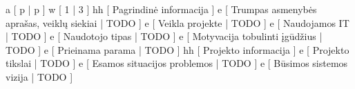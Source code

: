 \xtable
{
  a [ p | p ]
  w [ 1 | 3 ]
  hh [ Pagrindinė informacija ]
  e [ Trumpas asmenybės aprašas, veiklų siekiai | TODO ]
  e [ Veikla projekte | TODO ]
  e [ Naudojamos IT | TODO ]
  e [ Naudotojo tipas | TODO ]
  e [ Motyvacija tobulinti įgūdžius | TODO ]
  e [ Prieinama parama | TODO ]
  hh [ Projekto informacija ]
  e [ Projekto tikslai | TODO ]
  e [ Esamos situacijos problemos | TODO ]
  e [ Būsimos sistemos vizija | TODO  ]
}
